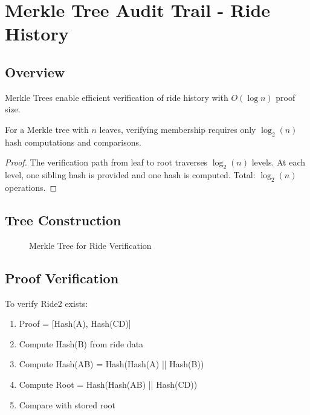 \section{Merkle Tree Audit Trail - Ride History}

\subsection{Overview}

Merkle Trees enable efficient verification of ride history with $O(\log n)$ proof size.

\begin{theorem}
For a Merkle tree with $n$ leaves, verifying membership requires only $\log_2(n)$ hash computations and comparisons.
\end{theorem}

\begin{proof}
The verification path from leaf to root traverses $\log_2(n)$ levels. At each level, one sibling hash is provided and one hash is computed. Total: $\log_2(n)$ operations.
\end{proof}

\subsection{Tree Construction}

\begin{figure}[H]
\centering
{}
\caption{Merkle Tree for Ride Verification}
\end{figure}

\subsection{Proof Verification}

To verify Ride2 exists:
\begin{enumerate}
    \item Proof = [Hash(A), Hash(CD)]
    \item Compute Hash(B) from ride data
    \item Compute Hash(AB) = Hash(Hash(A) || Hash(B))
    \item Compute Root = Hash(Hash(AB) || Hash(CD))
    \item Compare with stored root
\end{enumerate}

